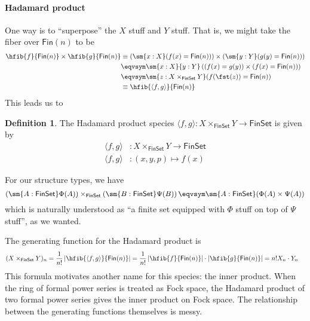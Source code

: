 \documentclass[fleqn]{article}
\newcommand{\fin}{\mathsf{Fin}}
\newcommand{\finset}{\mathsf{FinSet}}
\newcommand{\abs}[1]{\left\lvert #1 \right\rvert}
\theoremstyle{theorem}
\theoremstyle{definition}
\newtheorem{defn}{Definition}[section]
\begin{document}
\paragraph{Hadamard product}
One way is to ``superpose'' the
$X$ stuff and $Y$ stuff.  That is, we might take the fiber over $\fin(n)$ to be
\begin{align*}
  \hfib{f}{\fin(n)} \times \hfib{g}{\fin(n)}
  &\equiv
  \left(\sm{x : X}(f(x) = \fin(n))\right)
  \times
  \left(\sm{y : Y}(g(y) = \fin(n))\right)
  \\&\eqvsym
  \sm{x : X}{y : Y}\left(
    (f(x) = g(y))
    \times
    (f(x) = \fin(n))
  \right)
  \\&\eqvsym
  \sm{z : X \times_{\finset} Y} (f(\fst(z)) = \fin(n))
  \\&\equiv
  \hfib{\langle f, g \rangle}{\fin(n)}
\end{align*}
This leads us to
\begin{defn}
  The Hadamard product species $\langle f, g \rangle : X \times_{\finset} Y \to
  \finset$ is given by
  \begin{align*}
    \langle f, g \rangle &: X \times_{\finset} Y \to
    \finset \\
    \langle f, g \rangle &: (x, y, p) \mapsto f(x) 
  \end{align*}
\end{defn}
\noindent
For our structure types, we have
\[
  \left(\sm{A:\finset}\Phi(A)\right)
  \times_{\finset}
  \left(\sm{B:\finset}\Psi(B)\right)
  \eqvsym
  \sm{A:\finset}(\Phi(A) \times \Psi(A))
\]
which is naturally understood as ``a finite set equipped with $\Phi$ stuff on
top of $\Psi$ stuff'', as we wanted.

The generating function for the Hadamard product is
\begin{align*}
  (X \times_{\finset} Y)_{n}
  &=
  \frac{1}{n!}\abs{\hfib{\langle f, g \rangle}{\fin(n)}}
  =
  \frac{1}{n!}\abs{\hfib{f}{\fin(n)}} \cdot \abs{\hfib{g}{\fin(n)}}
  =
  n! X_{n} \cdot Y_{n}
\end{align*}
This formula motivates another name for this species: the inner product.  When
the ring of formal power series is treated as Fock space, the Hadamard product
of two formal power series gives the inner product on Fock space.  The
relationship between the generating functions themselves is messy.
\end{document}
